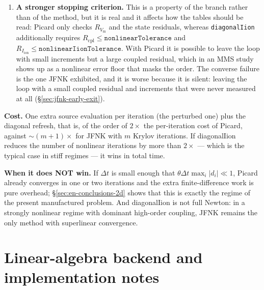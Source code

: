 \documentclass[11pt,a4paper]{article}
\newcommand{\code}[1]{\texttt{\small #1}}
\newcommand{\Vm}{V_{\text{m}}}
\newcommand{\Iion}{I_{\mathrm{ion}}}
\begin{document}
\begin{enumerate}
\item \textbf{A stronger stopping criterion.} This is a property of the branch
rather than of the method, but it is real and it affects how the tables should
be read: Picard only checks $R_{\Vm}$ and the state residuals, whereas
\code{diagonalIion} additionally requires
$R_{\mathrm{cpl}}\le\texttt{nonlinearTolerance}$ and
$R_{\Iion}\le\texttt{nonlinearIionTolerance}$. With Picard it is possible to
leave the loop with small increments but a large coupled residual, which in an
MMS study shows up as a nonlinear error floor that masks the order. The converse
failure is the one JFNK exhibited, and it is worse because it is silent: leaving
the loop with a small coupled residual and increments that were never measured
at all (\S\ref{sec:jfnk-early-exit}).
\end{enumerate}

\textbf{Cost.} One extra source evaluation per iteration (the perturbed one) plus the diagonal
refresh, that is, of the order of $2\times$ the per-iteration cost of Picard,
against $\sim(m+1)\times$ for JFNK with $m$ Krylov iterations. If
diagonalIion reduces the number of nonlinear iterations by more than
$2\times$ --- which is the typical case in stiff regimes --- it wins in total
time.

\textbf{When it does NOT win.} If $\Delta t$ is small enough that $\theta\Delta t\max_i|d_i|\ll1$, Picard
already converges in one or two iterations and the extra finite-difference work
is pure overhead; \S\ref{sec:en-conclusions-2d} shows that this is exactly the
regime of the present manufactured problem. And diagonalIion is not full
Newton: in a strongly nonlinear regime with dominant high-order coupling, JFNK
remains the only method with superlinear convergence.

\section{Linear-algebra backend and implementation notes}
\label{sec:linear-backend}
\end{document}
